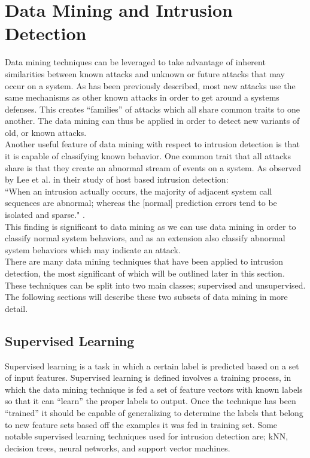 \documentclass[12pt]{article} %
\begin{document}
\section{Data Mining and Intrusion Detection}
Data mining techniques can be leveraged to take advantage of inherent similarities between known attacks and unknown or future attacks that may occur on a system. As has been previously described, most new attacks use the same mechanisms as other known attacks in order to get around a systems defenses. This creates ``families'' of attacks which all share common traits to one another. The data mining can thus be applied in order to detect new variants of old, or known attacks.\\
Another useful feature of data mining with respect to intrusion detection is that it is capable of classifying known behavior. One common trait that all attacks share is that they create an abnormal stream of events on a system. As observed by Lee et al. in their study of host based intrusion detection:\\
``When an intrusion actually occurs, the majority of adjacent system call sequences are abnormal; whereas the [normal] prediction errors tend to be isolated and sparse." \cite{lee97}. \\
This finding is significant to data mining as we can use data mining in order to classify normal system behaviors, and as an extension also classify abnormal system behaviors which may indicate an attack.\\
There are many data mining techniques that have been applied to intrusion detection, the most significant of which will be outlined later in this section. These techniques can be split into two main classes; supervised and unsupervised. The following sections will describe these two subsets of data mining in more detail.\\

\subsection{Supervised Learning}
Supervised learning is a task in which a certain label is predicted based on a set of input features. Supervised learning is defined involves a training process, in which the data mining technique is fed a set of feature vectors with known labels so that it can ``learn'' the proper labels to output. Once the technique has been ``trained'' it should be capable of generalizing to determine the labels that belong to new feature sets based off the examples it was fed in training set. Some notable supervised learning techniques used for intrusion detection are; kNN, decision trees, neural networks, and support vector machines.\\
\end{document}
